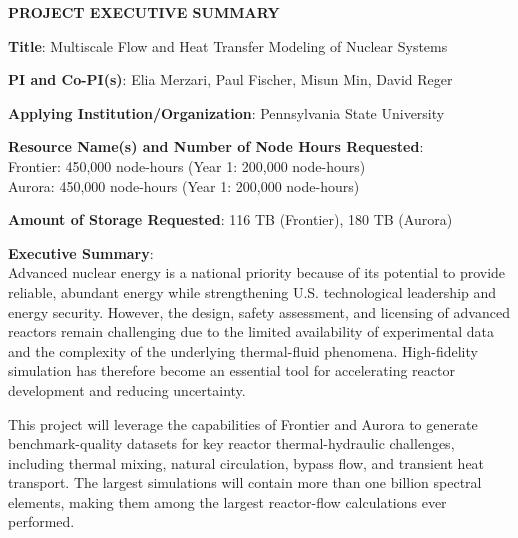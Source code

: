 \documentclass[11pt,letterpaper,english]{article}
\begin{document}
\setlength{\parindent}{0in} %

\pagestyle{fancy}   \renewcommand{%
\headrulewidth}{0.0pt}

\begin{center}
\bf {PROJECT EXECUTIVE SUMMARY} \\
\end{center}




\bigskip

\textbf{Title}: Multiscale Flow and Heat Transfer Modeling of Nuclear Systems \smallskip

\textbf{PI and Co-PI(s)}: Elia Merzari, Paul Fischer, Misun Min, David Reger \smallskip

\textbf{Applying Institution/Organization}: Pennsylvania State University \smallskip

\textbf{Resource Name(s) and Number of Node Hours Requested}: \\
Frontier: 450,000 node-hours  (Year 1: 200,000 node-hours) \\
Aurora: 450,000 node-hours   (Year 1: 200,000 node-hours)\\
\smallskip

\textbf{Amount of Storage Requested}: 116 TB (Frontier), 180 TB (Aurora)  \smallskip

\textbf{Executive Summary}: \\
\justify
Advanced nuclear energy is a national priority because of its potential to provide reliable, abundant energy while strengthening U.S. technological leadership and energy security. However, the design, safety assessment, and licensing of advanced reactors remain challenging due to the limited availability of experimental data and the complexity of the underlying thermal-fluid phenomena. High-fidelity simulation has therefore become an essential tool for accelerating reactor development and reducing uncertainty.

This project will leverage the capabilities of Frontier and Aurora to generate benchmark-quality datasets for key reactor thermal-hydraulic challenges, including thermal mixing, natural circulation, bypass flow, and transient heat transport. The largest simulations will contain more than one billion spectral elements, making them among the largest reactor-flow calculations ever performed.
\end{document}
